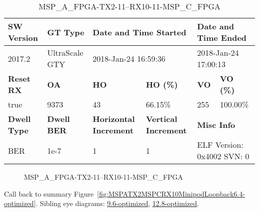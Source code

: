 \begin{table}[h]
\centering
\caption{MSP\_A\_FPGA-TX2-11--RX10-11-MSP\_C\_FPGA}
\label{tab:MSPAFPGATX211RX1011MSPCFPGA6.4-optimized}
\begin{tabular}{@{}|l|l|l|l|l|l|@{}}
\toprule
\textbf{SW Version}                & \textbf{GT Type}   & \multicolumn{2}{l|}{\textbf{Date and Time Started}}            & \multicolumn{2}{l|}{\textbf{Date and Time Ended}}        \\ \midrule
2017.2                       & UltraScale GTY          & \multicolumn{2}{l|}{2018-Jan-24 16:59:36}                   & \multicolumn{2}{l|}{2018-Jan-24 17:00:13}               \\ \midrule
\textbf{Reset RX}                  & \textbf{OA} & \textbf{HO}   & \textbf{HO (\%)} & \textbf{VO} & \textbf{VO (\%)} \\ \midrule
true & 9373        & 43          & 66.15\%        & 255        & 100.00\%       \\ \midrule
\textbf{Dwell Type}                & \textbf{Dwell BER} & \textbf{Horizontal Increment} & \textbf{Vertical Increment}    & \multicolumn{2}{l|}{\textbf{Misc Info}}                  \\ \midrule
BER                            & 1e-7        & 1        & 1           & \multicolumn{2}{l|}{ELF Version: 0x4002 SVN: 0}                         \\ \bottomrule
\end{tabular}
\end{table}

\begin{figure}[h]
\caption{MSP\_A\_FPGA-TX2-11--RX10-11-MSP\_C\_FPGA} \label{fig:MSPAFPGATX211RX1011MSPCFPGA6.4-optimized}
\end{figure}

Call back to summary Figure~\ref{fig:MSPATX2MSPCRX10MinipodLoopback6.4-optimized}.
Sibling eye diagrams: \hyperref[sec:MSPAFPGATX211RX1011MSPCFPGA9.6-optimized]{9.6-optimized}, \hyperref[sec:MSPAFPGATX211RX1011MSPCFPGA12.8-optimized]{12.8-optimized}.

\clearpage
\newpage

